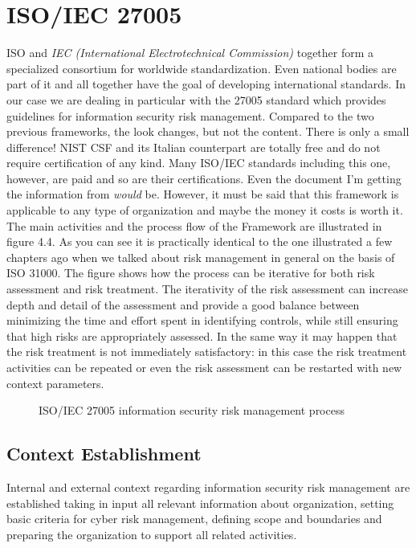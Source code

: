 \section{ISO/IEC 27005}
ISO and \textit{IEC (International Electrotechnical Commission)} together form a specialized consortium for worldwide standardization. Even national bodies are part of it and all together have the goal of developing international standards. In our case we are dealing in particular with the 27005 standard \cite{ISO/IEC2018} which provides guidelines for information security risk management. Compared to the two previous frameworks, the look changes, but not the content. There is only a small difference! NIST CSF and its Italian counterpart are totally free and do not require certification of any kind. Many ISO/IEC standards including this one, however, are paid and so are their certifications. Even the document I'm getting the information from \textit{would} be. However, it must be said that this framework is applicable to any type of organization and maybe the money it costs is worth it. The main activities and the process flow of the Framework are illustrated in figure 4.4. As you can see it is practically identical to the one illustrated a few chapters ago when we talked about risk management in general on the basis of ISO 31000. The figure shows how the process can be iterative for both risk assessment and risk treatment. The iterativity of the risk assessment can increase depth and detail of the assessment and provide a good balance between minimizing the time and effort spent in identifying controls, while still ensuring that high risks are appropriately assessed. In the same way it may happen that the risk treatment is not immediately satisfactory: in this case the risk treatment activities can be repeated or even the risk assessment can be restarted with new context parameters.
\begin{figure}[H]
  \centering
  
  \caption{ISO/IEC 27005 information security risk management process}
\end{figure}
\noindent
\subsection{Context Establishment}
Internal and external context regarding information security risk management are established taking in input all relevant information about organization, setting basic criteria for cyber risk management, defining scope and boundaries and preparing the organization to support all related activities.
